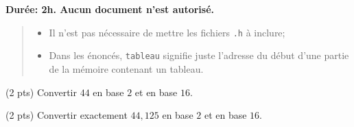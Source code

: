 
\def\modulename{pcp}
\RequirePackage[utf8]{course}
\pcp
\newif\ifsolution
\solutiontrue
\usepackage{listings}

\lstset{language=C}

\usepackage{caption}
\usepackage{subcaption}
\usepackage{units}
\usepackage{Cdefs}
\usepackage{tikz}
\usetikzlibrary{arrows}


\def\consigne#1{\null\begin{center}\parbox{13cm}{\large #1}\end{center}\relax}

\def\Question#1#2{\question{}\textbf{(#2)} #1}
\ifsolution
{}
\else
\excludecomment{solution}
\fi


\controleterminal

\consigne{{\bf Dur{\'e}e: 2h. Aucun document n'est autorisé.}}

\begin{quotation}
  \em 
  \begin{itemize}
  \item Il n'est pas nécessaire de mettre les fichiers \texttt{.h} à inclure;
  \item Dans les énoncés, \texttt{tableau} signifie juste l'adresse du
    début d'une partie de la mémoire contenant un tableau.
  \end{itemize}
\end{quotation}


\vspace*{1em}


\question (2 pts) Convertir \(44\) en base \(2\) et en base \(16\).

\question (2 pts) Convertir exactement \(44, 125\) en base \(2\) et
en base \(16\).


